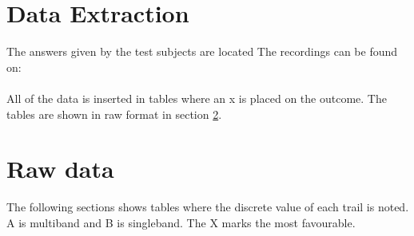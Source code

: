 \section{Data Extraction}
The answers given by the test subjects are located
The recordings can be found on:\\
\\
All of the data is inserted in tables where an x is placed on the outcome. The tables are shown in raw format in section \ref{sec:rawdata_listning}.



\section{Raw data}\label{sec:rawdata_listning}
The following sections shows tables where the discrete value of each trail is noted. A is multiband and B is singleband. The X marks the most favourable. 
